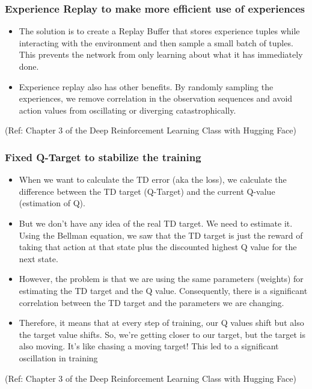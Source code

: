 \begin{frame}[fragile]\frametitle{Experience Replay to make more efficient use of experiences}


\begin{itemize}
\item The solution is to create a Replay Buffer that stores experience tuples while interacting with the environment and then sample a small batch of tuples. This prevents the network from only learning about what it has immediately done.
\item Experience replay also has other benefits. By randomly sampling the experiences, we remove correlation in the observation sequences and avoid action values from oscillating or diverging catastrophically.
\end{itemize}


{\tiny (Ref: Chapter 3 of the Deep Reinforcement Learning Class with Hugging Face)}

\end{frame}

\begin{frame}[fragile]\frametitle{Fixed Q-Target to stabilize the training}


\begin{itemize}
\item When we want to calculate the TD error (aka the loss), we calculate the difference between the TD target (Q-Target) and the current Q-value (estimation of Q).
\item But we don't have any idea of the real TD target. We need to estimate it. Using the Bellman equation, we saw that the TD target is just the reward of taking that action at that state plus the discounted highest Q value for the next state.
\item However, the problem is that we are using the same parameters (weights) for estimating the TD target and the Q value. Consequently, there is a significant correlation between the TD target and the parameters we are changing.
\item Therefore, it means that at every step of training, our Q values shift but also the target value shifts. So, we're getting closer to our target, but the target is also moving. It's like chasing a moving target! This led to a significant oscillation in training
\end{itemize}


{\tiny (Ref: Chapter 3 of the Deep Reinforcement Learning Class with Hugging Face)}

\end{frame}



